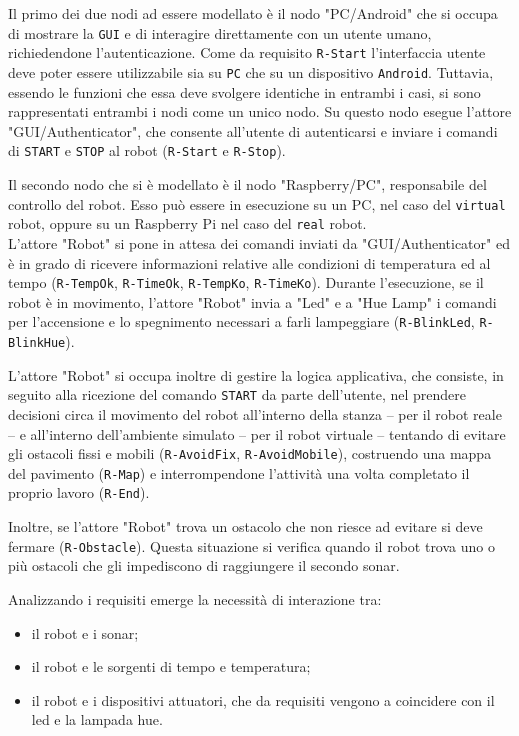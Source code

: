 \documentclass{llncs}
\newcommand{\action}[1]{\texttt{#1}\xspace}
\newcommand{\code}[1]{{\color{blue}\small{\texttt{#1}}}}
\newcommand{\fname}[1]{{\color{magenta}\small{\texttt{#1}}}}
\begin{document}
Il primo dei due nodi ad essere modellato è il nodo "PC/Android" che si occupa di mostrare la \action{GUI} e di interagire direttamente con un utente umano, richiedendone l'autenticazione. Come da requisito \code{R-Start} l'interfaccia utente deve poter essere utilizzabile sia su \action{PC} che su un dispositivo \action{Android}. Tuttavia, essendo le funzioni che essa deve svolgere identiche in entrambi i casi, si sono rappresentati entrambi i nodi come un unico nodo. Su questo nodo esegue l'attore "GUI/Authenticator", che consente all'utente di autenticarsi e inviare i comandi di \action{START} e \action{STOP} al robot (\code{R-Start} e \code{R-Stop}). 

Il secondo nodo che si è modellato è il nodo "Raspberry/PC", responsabile del controllo del robot. Esso può essere in esecuzione su un PC, nel caso del \fname{virtual} robot, oppure su un Raspberry Pi nel caso del \fname{real} robot. \\ L'attore "Robot" si pone in attesa dei comandi inviati da "GUI/Authenticator" ed è in grado di ricevere informazioni relative alle condizioni di temperatura ed al tempo (\code{R-TempOk}, \code{R-TimeOk}, \code{R-TempKo}, \code{R-TimeKo}). Durante l'esecuzione, se il robot è in movimento, l'attore "Robot" invia a "Led" e a "Hue Lamp" i comandi per l'accensione e lo spegnimento necessari a farli lampeggiare (\code{R-BlinkLed}, \code{R-BlinkHue}). 

L'attore "Robot" si occupa inoltre di gestire la logica applicativa, che consiste, in seguito alla ricezione del comando \action{START} da parte dell'utente, nel prendere decisioni circa il movimento del robot all'interno della stanza – per il robot reale – e all'interno dell'ambiente simulato – per il robot virtuale – tentando di evitare gli ostacoli fissi e mobili (\code{R-AvoidFix}, \code{R-AvoidMobile}), costruendo una mappa del pavimento (\code{R-Map}) e interrompendone l'attività una volta completato il proprio lavoro (\code{R-End}).

Inoltre, se l'attore "Robot" trova un ostacolo che non riesce ad evitare si deve fermare (\code{R-Obstacle}).
Questa situazione si verifica quando il robot trova uno o più ostacoli che gli impediscono di raggiungere il secondo sonar.

Analizzando i requisiti emerge la necessità di interazione tra:
\begin{itemize}
	\setlength\itemsep{0em}
	\item il robot e i sonar;
	\item il robot e le sorgenti di tempo e temperatura;
	\item il robot e i dispositivi attuatori, che da requisiti vengono a coincidere con il led e la lampada hue.
\end{itemize}
\end{document}

